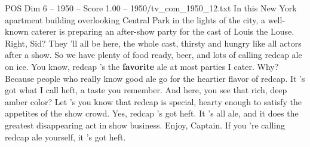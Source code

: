 \begin{textsample}{POS Dim 6 – 1950 – Score 1.00 – 1950/tv\_com\_1950\_12.txt}  \label{ex:f6_pos_015}
In this New York apartment building overlooking Central Park in the lights of the city, a well-known caterer is preparing an after-show party for the cast of Louis the Louse.
Right, Sid?
They 'll all be here, the whole cast, thirsty and hungry like all actors after a show.
So we have plenty of food ready, beer, and lots of calling redcap ale on ice.
You know, redcap 's the \textbf{favorite} ale at most parties I cater.
Why?
Because people who really know good ale go for the heartier flavor of redcap.
It 's got what I call heft, a taste you remember.
And here, you see that rich, deep amber color?
Let 's you know that redcap is special, hearty enough to satisfy the appetites of the show crowd.
Yes, redcap 's got heft.
It 's all ale, and it does the greatest disappearing act in show business.
Enjoy, Captain.
If you 're calling redcap ale yourself, it 's got heft.

\end{textsample}
